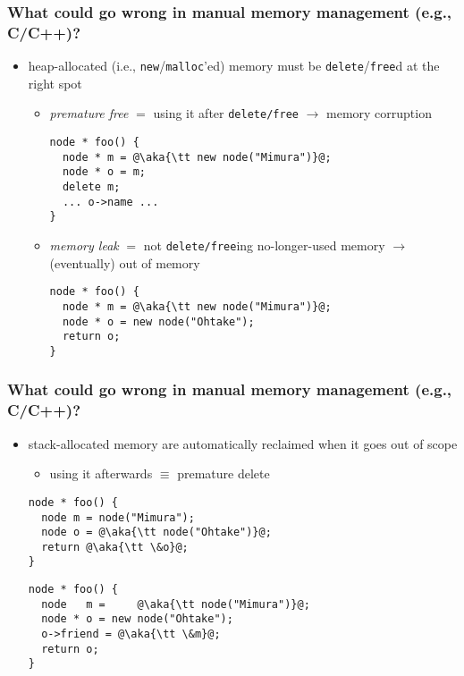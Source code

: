 \documentclass[12pt,dvipdfmx]{beamer}
\newif\ifja
\newif\ifeng
\newcommand{\ao}[1]{{\color{blue}#1}}
\newcommand{\aka}[1]{{\color{red}#1}}
\begin{document}
\ifja
\begin{frame}[fragile]
\frametitle{あ}
\begin{itemize}
\item あ
\end{itemize}
\begin{lstlisting}
あ
\end{lstlisting}
\end{frame}
\fi
\ifeng
\begin{frame}[fragile]
  \frametitle{What could go wrong in manual memory management (e.g., C/C++)?}
  \begin{itemize}
  \item heap-allocated (i.e., {\tt new}/{\tt malloc}'ed) memory
    must be {\tt delete}/{\tt free}d at the right spot
    \begin{itemize}
    \item
      \ao{\it premature free} $=$
      using it after {\tt delete/free} $\rightarrow$ memory corruption
\begin{lstlisting}
node * foo() {
  node * m = @\aka{\tt new node("Mimura")}@;
  node * o = m;
  delete m;
  ... o->name ...
}    
\end{lstlisting}
      
    \item \ao{\it memory leak} $=$
      not {\tt delete/free}ing no-longer-used memory $\rightarrow$
      (eventually) out of memory
      
\begin{lstlisting}
node * foo() {
  node * m = @\aka{\tt new node("Mimura")}@;
  node * o = new node("Ohtake");
  return o;
}    
\end{lstlisting}
    \end{itemize}
\end{itemize}
\end{frame}


\begin{frame}[fragile]
  \frametitle{What could go wrong in manual memory management (e.g., C/C++)?}
  \begin{itemize}
  \item stack-allocated memory are automatically reclaimed when
    it goes out of scope
    \begin{itemize}
    \item using it afterwards $\equiv$ premature delete
    \end{itemize}
\begin{lstlisting}
node * foo() {
  node m = node("Mimura");
  node o = @\aka{\tt node("Ohtake")}@;
  return @\aka{\tt \&o}@;
}    
\end{lstlisting}
\begin{lstlisting}
node * foo() {
  node   m =     @\aka{\tt node("Mimura")}@;
  node * o = new node("Ohtake");
  o->friend = @\aka{\tt \&m}@;
  return o;
}    
\end{lstlisting}
  \end{itemize}
  

\end{frame}
\end{document}
